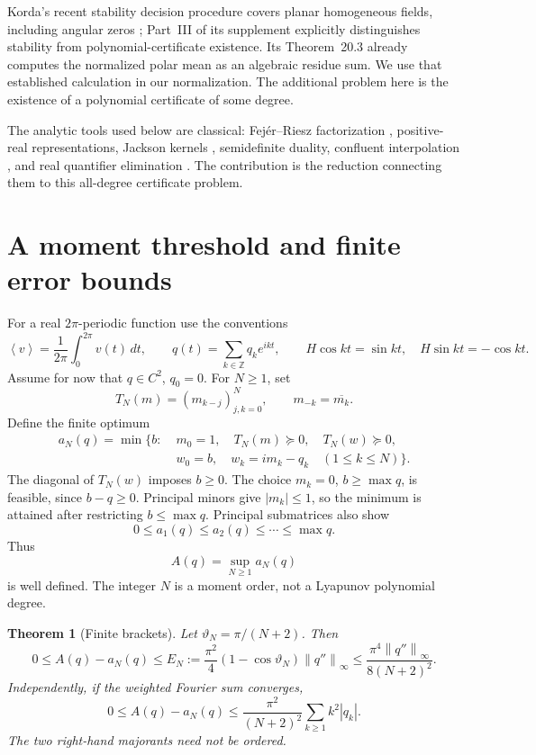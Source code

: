 \documentclass[11pt,a4paper]{article}
\newtheorem{theorem}{Theorem}[section]
\theoremstyle{remark}\newtheorem{remark}[theorem]{Remark}
\newcommand{\av}[1]{\left\langle #1\right\rangle}
\newcommand{\norm}[1]{\left\lVert #1\right\rVert}
\begin{document}
Korda's recent stability decision procedure covers planar homogeneous
fields, including angular zeros \cite{korda}; Part~III of its supplement
explicitly distinguishes stability from polynomial-certificate existence.
Its Theorem~20.3 already computes the normalized polar mean as an
algebraic residue sum. We use that established calculation in our
normalization. The additional problem here is the existence of a
polynomial certificate of some degree.

The analytic tools used below are classical: Fej\'er--Riesz
factorization \cite{fejer}, positive-real representations,
Jackson kernels \cite{jackson}, semidefinite duality, confluent
interpolation \cite{clark}, and real quantifier elimination
\cite{tarski}. The contribution is the reduction connecting them
to this all-degree certificate problem.

\section{A moment threshold and finite error bounds}
For a real \(2\pi\)-periodic function use the conventions
\[
 \av{v}=\frac1{2\pi}\int_0^{2\pi}v(t)\,dt,\qquad
 q(t)=\sum_{k\in\mathbb Z}q_k e^{ikt},\qquad
 H\cos kt=\sin kt,\quad H\sin kt=-\cos kt.
\]
Assume for now that \(q\in C^2\), \(q_0=0\).
For \(N\geq1\), set
\[
 T_N(m)=(m_{k-j})_{j,k=0}^N,\qquad m_{-k}=\overline{m_k}.
\]
Define the finite optimum
\begin{equation}\label{eq:sdp}
 \begin{split}
 a_N(q)=\min\{b:\;&m_0=1,\quad T_N(m)\succeq0,\quad T_N(w)\succeq0,\\
 &w_0=b,\quad w_k=i m_k-q_k\quad(1\leq k\leq N)\}.
 \end{split}
\end{equation}
The diagonal of \(T_N(w)\) imposes \(b\geq0\).
The choice \(m_k=0\), \(b\geq\max q\), is feasible, since
\(b-q\geq0\). Principal minors give \(|m_k|\leq1\), so the
minimum is attained after restricting \(b\leq\max q\).
Principal submatrices also show
\[
 0\leq a_1(q)\leq a_2(q)\leq\cdots\leq\max q.
\]
Thus
\begin{equation}\label{eq:A}
 A(q)=\sup_{N\geq1}a_N(q)
\end{equation}
is well defined. The integer \(N\) is a moment order, not a
Lyapunov polynomial degree.

\begin{theorem}[Finite brackets]\label{thm:brackets}
Let \(\vartheta_N=\pi/(N+2)\). Then
\begin{equation}\label{eq:En}
 0\leq A(q)-a_N(q)
 \leq E_N:=\frac{\pi^2}{4}(1-\cos\vartheta_N)\norm{q''}_\infty
 \leq\frac{\pi^4\norm{q''}_\infty}{8(N+2)^2}.
\end{equation}
Independently, if the weighted Fourier sum converges,
\begin{equation}\label{eq:fourierbound}
 0\leq A(q)-a_N(q)
 \leq \frac{\pi^2}{(N+2)^2}\sum_{k\geq1}k^2|q_k|.
\end{equation}
The two right-hand majorants need not be ordered.
\end{theorem}
\end{document}
